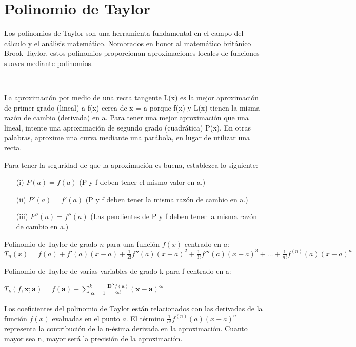 \section{Polinomio de Taylor}
Los polinomios de Taylor son una herramienta fundamental en el campo del cálculo y el análisis matemático. Nombrados en honor al matemático británico Brook Taylor, estos polinomios proporcionan aproximaciones locales de funciones suaves mediante polinomios.

\

La aproximación por medio de una recta tangente L(x) es la mejor aproximación de primer grado (lineal) a f(x) cerca de x = a porque f(x) y L(x) tienen la misma razón de cambio (derivada) en a. Para tener una mejor aproximación que una lineal, intente una aproximación de segundo grado (cuadrática) P(x). En otras palabras, aproxime una curva mediante una parábola, en lugar de utilizar una recta. 

Para tener la seguridad de que la aproximación es buena, 
establezca lo siguiente:
\begin{itemize}
    \item[(i)] \(P(a) = f(a)\) (P y f deben tener el mismo valor en a.)
    \item[(ii)] \(P'(a) = f'(a)\) (P y f deben tener la misma razón de cambio en a.)
    \item[(iii)] \(P''(a) = f''(a)\) (Las pendientes de P y f deben tener la misma razón de cambio en a.)
\end{itemize}

 Polinomio de Taylor de grado \(n\) para una función \(f(x)\) centrado en \(a\):
 \(T_n(x) = f(a) + f'(a)(x-a) + \frac{1}{2!}f''(a)(x-a)^2 + \frac{1}{3!}f'''(a)(x-a)^3 + \ldots + \frac{1}{n!}f^{(n)}(a)(x-a)^n\) \vspace{2mm}

 Polinomio de Taylor de varias variables de grado k para f centrado en a: \vspace{2mm}

 $T_k(f, \mathbf{x}; \mathbf{a}) = f(\mathbf{a}) + \sum_{|\mathbf{\alpha}|=1}^{k} \frac{\mathbf{D}^\mathbf{\alpha}f(\mathbf{a})}{\mathbf{\alpha}!} (\mathbf{x} - \mathbf{a})^\mathbf{\alpha}
$ \vspace{2mm}

 Los coeficientes del polinomio de Taylor están relacionados con las derivadas de la función \(f(x)\) evaluadas en el punto \(a\). El término \(\frac{1}{n!}f^{(n)}(a)(x-a)^n
\) representa la contribución de la n-ésima derivada en la aproximación. Cuanto mayor sea n, mayor será la precisión de la aproximación.
 

